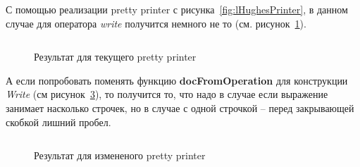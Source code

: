 С помощью реализации pretty printer с рисунка~\ref{fig:lHughesPrinter}, в данном случае для оператора \textit{write} получится немного не то (см. рисунок~\ref{fig:lCurWriteEx}).
\begin{figure}[h!]
	\inputminted{pascal}{codes/lCurWriteEx.l}
	\caption{Результат для текущего pretty printer}
	\label{fig:lCurWriteEx}
\end{figure}

А если попробовать поменять функцию \textbf{docFromOperation} для конструкции \textit{Write} (см рисунок~\ref{fig:lHughesWriteChange}), то получится то, что надо в случае если выражение занимает насколько строчек, но в случае с одной строчкой -- перед закрывающей скобкой лишний пробел.
\begin{figure}[h!]
	\inputminted{pascal}{codes/lBadWriteEx.l}
	\caption{Результат для измененого pretty printer}
	\label{fig:lBadWriteEx}
\end{figure}

\begin{figure}[h!]
	\inputminted{haskell}{codes/lHughesWriteChange.hs}
	\caption{}
	\label{fig:lHughesWriteChange}
\end{figure}